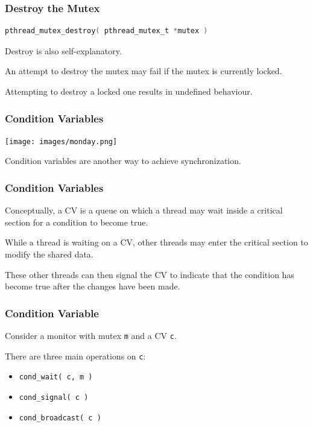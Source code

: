 \begin{frame}[fragile]
	\frametitle{Destroy the Mutex}

	\begin{lstlisting}[language=C]
pthread_mutex_destroy( pthread_mutex_t *mutex )
\end{lstlisting}

	Destroy is also self-explanatory.

	An attempt to destroy the mutex may fail if the mutex is currently locked.

	Attempting to destroy a locked one results in undefined behaviour.

\end{frame}

\begin{frame}
	\frametitle{Condition Variables}

	\begin{center}
		\texttt{[image: images/monday.png]}
	\end{center}

	Condition variables are another way to achieve synchronization.

\end{frame}

\begin{frame}
	\frametitle{Condition Variables}

	Conceptually, a CV is a queue on which a thread may wait inside a critical section for a condition to become true.

	While a thread is waiting on a CV, other threads may enter the critical section to modify the shared data.

	These other threads can then signal the CV to indicate that the condition has become true after the changes have been made.

\end{frame}


\begin{frame}
	\frametitle{Condition Variable}

	Consider a monitor with mutex \texttt{m} and a CV \texttt{c}.

	There are three main operations on \texttt{c}:

	\begin{itemize}
		\item \texttt{cond\_wait( c, m )}
		\item \texttt{cond\_signal( c )}
		\item \texttt{cond\_broadcast( c )}
	\end{itemize}

\end{frame}

